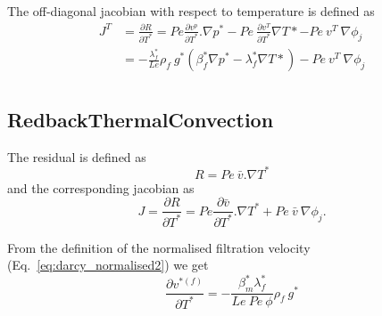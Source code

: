 \documentclass[]{scrreprt}
\begin{document}
The off-diagonal jacobian with respect to temperature is defined as
\begin{subequations}
  \label{eq:off_diag_jac_mass_conv1}
  \begin{align}
  J^T &= \frac{\partial R}{\partial T^*} = Pe \frac{\partial v^p}{\partial T^*}.\nabla p^* - Pe\:\frac{\partial v^T}{\partial T^*}\nabla T* - Pe\:v^T\:\nabla \phi_j \\ \nonumber
    &=  -\frac{\lambda^*_f}{Le} \rho_f\:g^* (\beta^*_f \nabla p^* - \lambda^*_f \nabla T*) - Pe\:v^T\:\nabla \phi_j \\ \nonumber
  \end{align}
\end{subequations}

\subsection{RedbackThermalConvection}
The residual is defined as
\begin{equation}
  R = Pe\: \bar{v}.\nabla T^*
\end{equation}
and the corresponding jacobian as
\begin{equation}
  \label{eq:def_jac_heat_conv}
  J = \frac{\partial R}{\partial T^*} = Pe \frac{\partial \bar{v}}{\partial T^*}.\nabla T^* + Pe\:\bar{v}\:\nabla \phi_j.
\end{equation}

From the definition of the normalised filtration velocity (Eq.~\ref{eq:darcy_normalised2}) we get
\begin{equation}
  \frac{\partial v^{*(f)}}{\partial T^*} = -\frac{\beta^*_m \lambda^*_f}{Le\:Pe\:\phi}\rho_f\:g^*
\end{equation}
\end{document}
